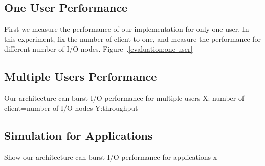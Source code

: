 \subsection{One User Performance}
First we measure the performance of our implementation for only one user.
In this experiment, fix the number of client to one, and measure the performance for different 
number of I/O nodes. Figure~.\ref{evaluation:one user}

\subsection{Multiple Users Performance}
Our architecture can burst I/O performance for multiple users
X: number of client=number of I/O nodes Y:throughput

\subsection{Simulation for Applications}
Show our architecture can burst I/O performance for applications
x